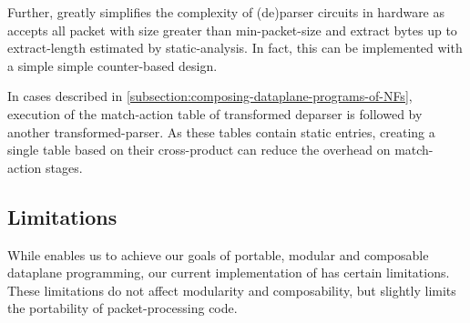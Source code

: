 \documentclass[letterpaper,twocolumn,10pt]{article}
\begin{document}
Further, \ucomp greatly simplifies the complexity of (de)parser
circuits in hardware as \ucomp accepts all packet with size greater
than min-packet-size and extract bytes up to extract-length estimated
by static-analysis. In fact, this can be implemented with a simple
simple counter-based design.


 In cases described in
\cref{subsection:composing-dataplane-programs-of-NFs}, execution of
the match-action table of transformed deparser is followed by another
transformed-parser. As these tables contain static entries, creating a
single table based on their cross-product can reduce the overhead on
match-action stages.









\subsection{Limitations}
\label{sec:limitations}
While \ulang enables us to achieve our goals of portable, modular and
composable dataplane programming, our current implementation of \ucomp
has certain limitations. These limitations do not affect modularity
and composability, but slightly limits the portability of
packet-processing code.
\end{document}

